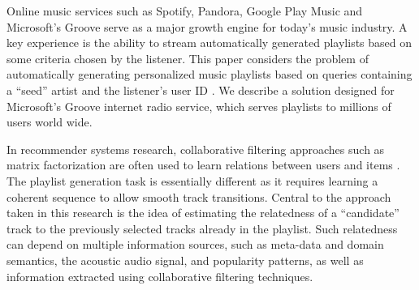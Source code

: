 Online music services such as Spotify, Pandora, Google Play Music and Microsoft's Groove serve as a major growth engine for today's music industry. A key experience is the ability to stream automatically generated playlists based on some criteria chosen by the listener.
This paper considers the problem of automatically generating personalized music playlists based on queries containing a ``seed'' artist and the listener's user ID . We describe a solution designed for Microsoft's Groove internet radio  service, which serves playlists to millions of users world wide. 

In recommender systems research, collaborative filtering approaches such as matrix factorization are often used to learn relations between users and items \cite{KorenBV09}. 
The playlist generation task is essentially different as it requires learning a coherent sequence to allow smooth track transitions.
Central to the approach taken in this research is the idea of estimating the relatedness of a ``candidate'' track to the previously selected tracks already in the playlist.
Such relatedness can depend on multiple information sources, such as meta-data and domain semantics, the acoustic audio signal,  and popularity patterns, as well as information extracted using collaborative filtering techniques.  

